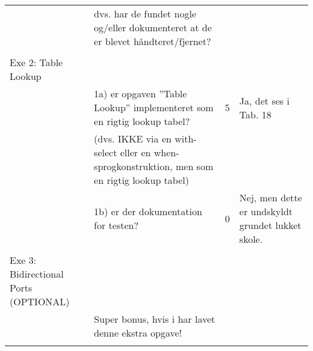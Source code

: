 \begin{table}[h]
\begin{tabularx}{\textwidth}{p{3.5cm}Xp{5mm}X}
                                                               & dvs. har de fundet nogle og/eller dokumenteret at de er blevet håndteret/fjernet?              &   &                                                                           \\
                                                               &                                                                                                &   &                                                                           \\\midrule
        Exe 2: Table Lookup                                    &                                                                                                &   &                                                                           \\
                                                               & 1a) er opgaven ”Table Lookup” implementeret som en rigtig lookup tabel?                        & 5 & Ja, det ses i Tab. 18                                             \\
                                                               & (dvs. IKKE via en with-select eller en when-sprogkonstruktion, men som en rigtig lookup tabel) &   &                                                                           \\
                                                               & 1b) er der dokumentation for testen?                                                           & 0 & Nej, men dette er undskyldt grundet lukket skole.                     \\
                                                               &                                                                                                &   &                                                                           \\\midrule
        Exe 3: Bidirectional Ports (OPTIONAL)                  &                                                                                                &   &                                                                           \\
                                                               & Super bonus, hvis i har lavet denne ekstra opgave!                                             &  &                 \\
                                                               &
    \end{tabularx}
\end{table}
